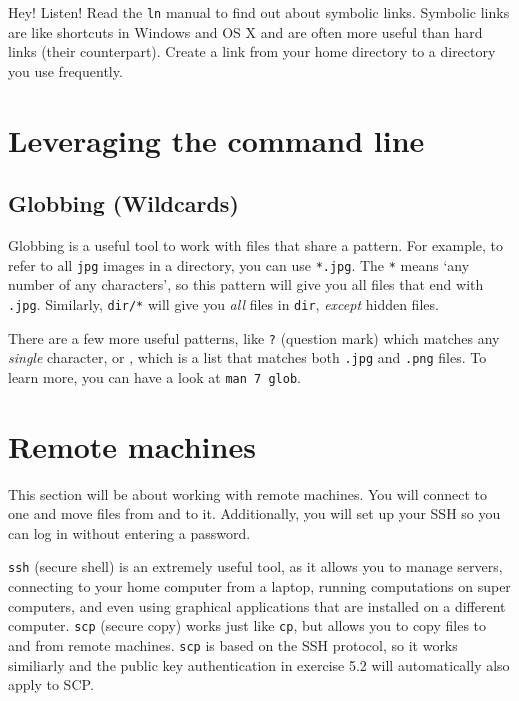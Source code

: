 \documentclass{TheAlternativeCourse}
\begin{document}
\begin{exercisebox}{Hey! Listen!}
	Read the \texttt{ln} manual to find out about symbolic links. Symbolic links are like shortcuts in Windows and OS X and are often more useful than hard links (their counterpart). Create a link from your home directory to a directory you use frequently.
\end{exercisebox}

\section{Leveraging the command line}

\subsection{Globbing (Wildcards)}

Globbing is a useful tool to work with files that share a pattern. For example,
to refer to all \texttt{jpg} images in a directory, you can use \texttt{*.jpg}.
The \texttt{*} means `any number of any characters', so this pattern will give
you all files that end with \texttt{.jpg}. Similarly, \texttt{dir/*} will give
you \emph{all} files in \texttt{dir}, \emph{except} hidden files.

There are a few more useful patterns, like \texttt{?} (question mark) which
matches any \emph{single} character, or \texttt{},
which is a list that matches both \texttt{.jpg} and \texttt{.png} files. To
learn more, you can have a look at \texttt{man 7 glob}.

\section{Remote machines}

This section will be about working with remote machines. You will
connect to one and move files from and to it. Additionally, you will set up
your SSH so you can log in without entering a password.

\texttt{ssh} (secure shell) is an extremely useful tool, as it allows you to
manage servers, connecting to your home computer from a laptop, running
computations on super computers, and even using graphical applications that are
installed on a different computer. \texttt{scp} (secure copy) works just like
\texttt{cp}, but allows you to copy files to and from remote machines.
\texttt{scp} is based on the SSH protocol, so it works similiarly and the
public key authentication in exercise 5.2 will automatically also apply to SCP.
\end{document}

